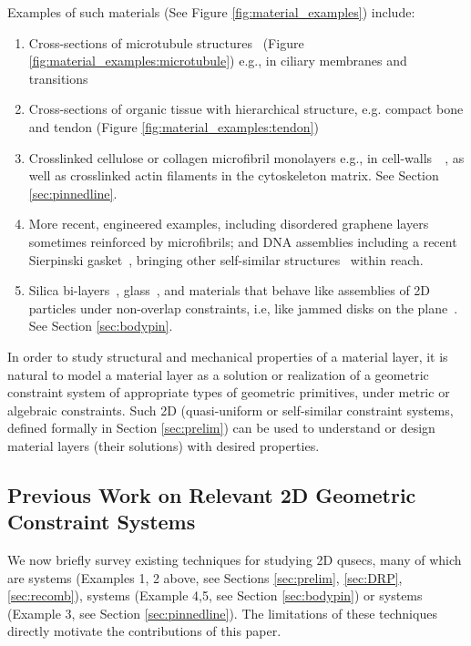 Examples of such materials (See Figure \ref{fig:material_examples})
include:
%
\begin{enumerate}
    \item Cross-sections of microtubule structures~\cite{microtubule_necklace} (Figure \ref{fig:material_examples:microtubule}) e.g., in ciliary membranes and transitions~\cite{microtubule_cilia}

    \item Cross-sections of organic tissue with hierarchical structure, e.g. compact bone and tendon (Figure \ref{fig:material_examples:tendon}) \uncited

    \item Crosslinked cellulose or collagen microfibril monolayers e.g., in cell-walls~\cite{wikimediacommons2010afm}~\cite{wikimediacommons2007plant}, as well as crosslinked actin filaments in the cytoskeleton matrix. See Section \ref{sec:pinnedline}.

    \item More recent, engineered examples, including disordered
    graphene layers~\cite{Graphene1}~\cite{Graphene2} sometimes
    reinforced by microfibrils; and DNA assemblies including a recent
    Sierpinski gasket~\cite{self_assembly_sierpinski}, bringing other
    self-similar structures~\cite{wikimediacommons2012subdivision} within reach.

    \item Silica bi-layers~\cite{silica_bilayers}, glass~\cite{sructure_of_2d_glass}, and
    materials that behave like assemblies of 2D particles under
    non-overlap constraints, i.e, like jammed disks on the plane~\cite{jammed_disks}. See Section \ref{sec:bodypin}.
\end{enumerate}
%
In order to study structural and mechanical properties
of a material layer, it is natural to model a material layer as a solution or
realization of a geometric constraint system of appropriate types of geometric
primitives, under metric or algebraic constraints. Such 2D
 (quasi-uniform or self-similar constraint systems, defined
formally in Section \ref{sec:prelim}) can be
used to understand or design material layers (their solutions) with
desired properties.
%
\subsection{Previous Work on Relevant 2D Geometric Constraint Systems}
We now briefly survey existing techniques for studying 2D
qusecs,  many of which are  systems
(Examples 1, 2 above, see Sections \ref{sec:prelim}, \ref{sec:DRP}, \ref{sec:recomb}),
 systems (Example 4,5, see Section
\ref{sec:bodypin}) or  systems (Example
3, see Section \ref{sec:pinnedline}). The limitations of these
techniques directly motivate the contributions of this paper.


